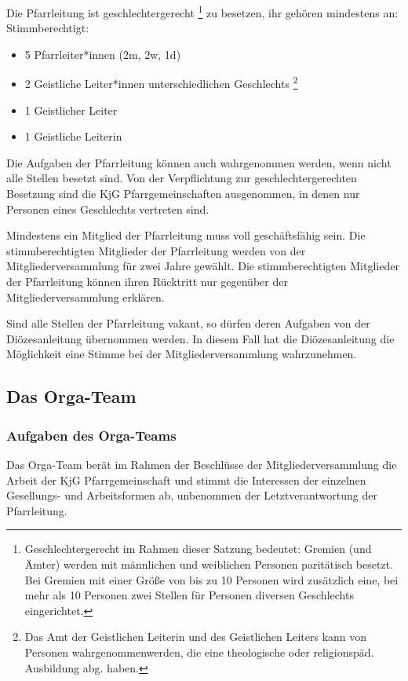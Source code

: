 \documentclass[12pt]{report}
\newcommand{\footnoteremember}[2]{
  \footnote{#2}
  \newcounter{#1}
  \setcounter{#1}{\value{footnote}}
}
\newcommand{\footnoterecall}[1]{%
  \footnotemark[\value{#1}]
}
\begin{document}
\begin{flushleft}
Die Pfarrleitung ist {\color{red} geschlechtergerecht\footnoteremember{geschlechtergerecht}{Geschlechtergerecht im Rahmen dieser Satzung bedeutet: Gremien (und Ämter) werden mit männlichen und
weiblichen Personen paritätisch besetzt. Bei Gremien mit einer Größe von bis zu 10 Personen wird zusätzlich
eine, bei mehr als 10 Personen zwei Stellen für Personen diversen Geschlechts eingerichtet.}} zu besetzen, ihr gehören mindestens an:
Stimmberechtigt:
\begin{itemize}
  \item 5 Pfarrleiter*innen (2m, 2w, 1d)
  \item 2 Geistliche Leiter*innen unterschiedlichen Geschlechts\footnoteremember{Berechtigung Geist}{
    Das Amt der Geistlichen Leiterin und des Geistlichen Leiters kann von Personen wahrgenommenwerden,
    die eine theologische oder religionspäd. Ausbildung abg. haben.
  }
  \item {\color{red} 1 Geistlicher Leiter \footnoterecall{Berechtigung Geist}}
  \item {\color{red} 1 Geistliche Leiterin \footnoterecall{Berechtigung Geist}}
\end{itemize}
Die Aufgaben der Pfarrleitung können auch wahrgenommen werden, wenn nicht alle Stellen besetzt sind.
{\color{red} Von der Verpflichtung zur geschlechtergerechten Besetzung sind die KjG Pfarrgemeinschaften ausgenommen, in
denen nur Personen eines Geschlechts vertreten sind.}

Mindestens ein Mitglied der Pfarrleitung muss voll geschäftsfähig sein.
Die stimmberechtigten Mitglieder der Pfarrleitung werden von der Mitgliederversammlung für
zwei Jahre gewählt. Die stimmberechtigten Mitglieder der Pfarrleitung können ihren Rücktritt nur
gegenüber der Mitgliederversammlung erklären.

Sind alle Stellen der Pfarrleitung vakant, so dürfen deren Aufgaben von der
Diözesanleitung übernommen werden. In diesem Fall hat die Diözesanleitung die Möglichkeit eine
Stimme bei der Mitgliederversammlung wahrzunehmen.

\subsection{Das Orga-Team}

\subsubsection{Aufgaben des Orga-Teams}

Das Orga-Team berät im Rahmen der Beschlüsse der Mitgliederversammlung die Arbeit der KjG
Pfarrgemeinschaft und stimmt die Interessen der einzelnen Gesellungs- und Arbeitsformen ab,
unbenommen der Letztverantwortung der Pfarrleitung.


\end{flushleft}
\end{document}
